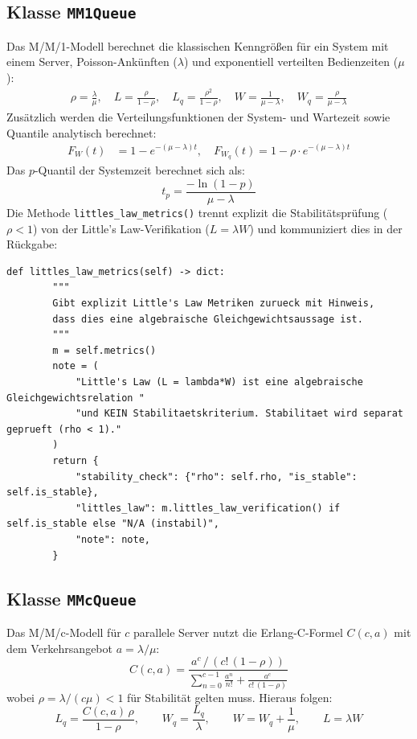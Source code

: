 ﻿\documentclass[a4paper,12pt]{report}
\theoremstyle{definition}
\begin{document}
\subsection{Klasse \texttt{MM1Queue}}

Das M/M/1-Modell berechnet die klassischen Kenngrößen für ein System
mit einem Server, Poisson-Ankünften ($\lambda$) und exponentiell
verteilten Bedienzeiten ($\mu$):
\begin{align}
	\rho = \frac{\lambda}{\mu}, \quad
	L = \frac{\rho}{1-\rho}, \quad
	L_q = \frac{\rho^2}{1-\rho}, \quad
	W = \frac{1}{\mu-\lambda}, \quad
	W_q = \frac{\rho}{\mu-\lambda}
\end{align}
Zusätzlich werden die Verteilungsfunktionen der System- und Wartezeit
sowie Quantile analytisch berechnet:
\begin{align}
	F_W(t) &= 1 - e^{-(\mu-\lambda)t}, \quad
	F_{W_q}(t) = 1 - \rho \cdot e^{-(\mu-\lambda)t}
\end{align}
Das $p$-Quantil der Systemzeit berechnet sich als:
\begin{equation}
	t_p = \frac{-\ln(1-p)}{\mu - \lambda}
\end{equation}
Die Methode \texttt{littles\_law\_metrics()} trennt explizit die Stabilitätsprüfung
($\rho < 1$) von der Little's Law-Verifikation ($L = \lambda W$) und
kommuniziert dies in der Rückgabe:

\begin{lstlisting}[style=python, caption={MM1Queue: Getrennte Stabilitäts- und Little's Law-Analyse}, label=lst:mm1-littles]
def littles_law_metrics(self) -> dict:
        """
        Gibt explizit Little's Law Metriken zurueck mit Hinweis,
        dass dies eine algebraische Gleichgewichtsaussage ist.
        """
        m = self.metrics()
        note = (
            "Little's Law (L = lambda*W) ist eine algebraische Gleichgewichtsrelation "
            "und KEIN Stabilitaetskriterium. Stabilitaet wird separat geprueft (rho < 1)."
        )
        return {
            "stability_check": {"rho": self.rho, "is_stable": self.is_stable},
            "littles_law": m.littles_law_verification() if self.is_stable else "N/A (instabil)",
            "note": note,
        }
\end{lstlisting}

\subsection{Klasse \texttt{MMcQueue}}

Das M/M/c-Modell für $c$ parallele Server nutzt die Erlang-C-Formel
$C(c, a)$ mit dem Verkehrsangebot $a = \lambda/\mu$:
\begin{equation}
	C(c, a) = \frac{a^c \,/\, (c!\,(1-\rho))}
	{\displaystyle\sum_{n=0}^{c-1} \frac{a^n}{n!} + \frac{a^c}{c!\,(1-\rho)}}
\end{equation}
wobei $\rho = \lambda/(c\mu) < 1$ für Stabilität gelten muss.
Hieraus folgen:
\begin{equation}
	L_q = \frac{C(c,a)\,\rho}{1-\rho}, \qquad
	W_q = \frac{L_q}{\lambda}, \qquad
	W = W_q + \frac{1}{\mu}, \qquad
	L = \lambda W
\end{equation}
\end{document}
